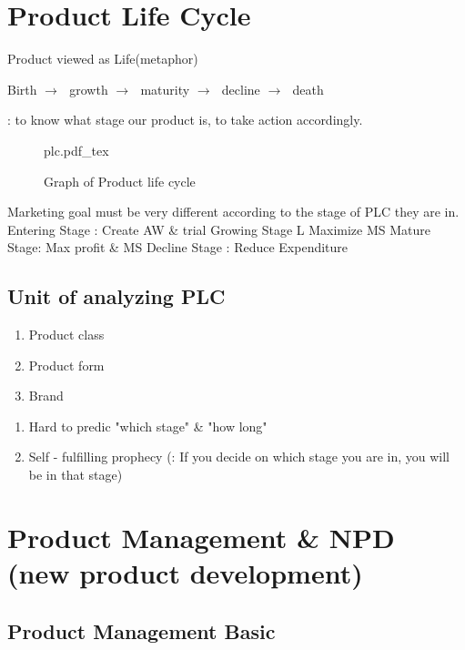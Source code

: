 \documentclass[12pt]{article}
\newcommand{\ra}{$\rightarrow \text{ }$}
\begin{document}
\section{Product Life Cycle}
\begin{tcolorbox}
	Product viewed as Life(metaphor)

	Birth \ra growth \ra maturity \ra decline \ra death

\end{tcolorbox}
: {\large to know what stage our product is, to take action accordingly.}

\begin{figure}[H]
	\centering
	\def\svgwidth{\columnwidth}
	{plc.pdf_tex}
	\caption{Graph of Product life cycle}
	\label{fig:plc}
\end{figure}

Marketing goal must be very different according to the stage of PLC they are in.
Entering Stage : Create AW \& trial
Growing Stage L Maximize MS
Mature Stage: Max profit \& MS
Decline Stage : Reduce Expenditure

\subsection{Unit of analyzing PLC}
\begin{enumerate}
	\item Product class
	\item Product form
	\item Brand
\end{enumerate}

\begin{center}
	\begin{enumerate}
		\item Hard to predic "which stage" \& "how long"
		\item Self - fulfilling prophecy (: If you decide on which stage you are in, you will be in that stage)
	\end{enumerate}

\end{center}

\section{Product Management \& NPD (new product development)}

\subsection{Product Management Basic}
\end{document}
